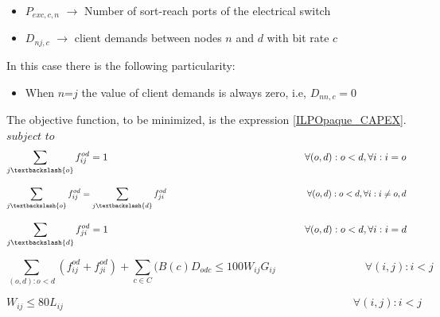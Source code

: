 \begin{itemize}
\item{$P_{exc,c,n}$	$\rightarrow$	Number of sort-reach ports of the electrical switch}
\item{$D_{nj,c}$	$\rightarrow$	client demands between nodes $n$ and $d$ with bit rate $c$}
\end{itemize}

\vspace{11pt}
In this case there is the following particularity:

\begin{itemize}
  \item When $n$=$j$ the value of client demands is always zero, i.e, $D_{nn,c}=0$
\end{itemize}


\vspace{17pt}
The objective function, to be minimized, is the expression \ref{ILPOpaque_CAPEX}.\\


$subject$ $to$
\begin{equation}
\sum_{j\textbackslash \{o\}} f_{ij}^{od} = 1  \qquad \qquad \qquad \qquad \qquad \qquad \qquad \qquad \qquad \qquad
\forall(o,d) : o < d, \forall i: i = o
\label{ILPOpaque1_Surv}
\end{equation}

\begin{equation}
\sum_{j\textbackslash \{o\}} f_{ij}^{od} = \sum_{j\textbackslash \{d\}} f_{ji}^{od}   \qquad \qquad \qquad \qquad \qquad \qquad \qquad \qquad
\forall(o,d) : o < d, \forall i: i \neq o,d
\label{ILPOpaque2_Surv}
\end{equation}

\begin{equation}
\sum_{j\textbackslash \{d\}} f_{ji}^{od} = 1  \qquad \qquad \qquad \qquad \qquad \qquad \qquad \qquad \qquad \qquad
\forall(o,d) : o < d, \forall i: i = d
\label{ILPOpaque3_Surv}
\end{equation}

\begin{equation}
\sum_{(o,d):o<d} \left(f_{ij}^{od} + f_{ji}^{od}\right) + \sum_{c\in C} (B\left(c\right) D_{odc}\leq100 W_{ij} G_{ij} \qquad \qquad \qquad \qquad
\forall(i,j) : i < j
\label{ILPOpaque4_Surv}
\end{equation}

\begin{equation}
W_{ij} \leq 80 L_{ij} \qquad  \qquad \qquad \qquad \qquad \qquad \qquad \qquad \qquad \qquad \qquad \qquad \qquad \forall(i,j) : i < j
\label{ILPOpaque5_Surv}
\end{equation}

